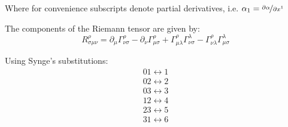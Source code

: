 \documentclass{article}
\begin{document}
Where for convenience subscripts denote partial derivatives, i.e. $\alpha_{1}=\nicefrac{\partial\alpha}{\partial x^{1}}$

The components of the Riemann tensor are given by:
\begin{equation}
R_{\sigma\mu\nu}^{\rho}=\partial_{\mu}\Gamma_{\nu\sigma}^{\rho}-\partial_{\nu}\Gamma_{\mu\sigma}^{\rho}+\Gamma_{\mu\lambda}^{\rho}\Gamma_{\nu\sigma}^{\lambda}-\Gamma_{\nu\lambda}^{\rho}\Gamma_{\mu\sigma}^{\lambda}
\end{equation}

Using Synge's substitutions:
\begin{equation}
\begin{array}{c}
01\longleftrightarrow1\\
02\longleftrightarrow2\\
03\longleftrightarrow3\\
12\longleftrightarrow4\\
23\longleftrightarrow5\\
31\longleftrightarrow6\\
\end{array}
\end{equation}
\end{document}
